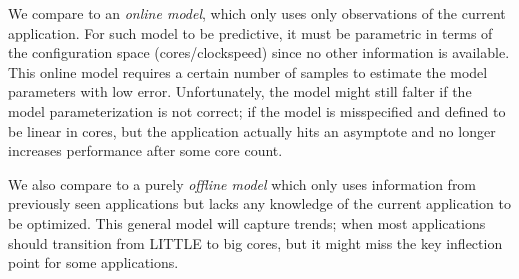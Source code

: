 


We compare \SYSTEM{} to an \emph{online model}, which only uses only
observations of the current application.  For such model to be
predictive, it must be parametric in terms of the configuration space
(cores/clockspeed) since no other information is available. This
online model requires a certain number of samples to estimate the
model parameters with low error.  Unfortunately, the model might still
falter if the model parameterization is not correct; \eg{} if the model
is misspecified and defined to be linear in cores, but the application
actually hits an asymptote and no longer increases performance after
some core count.

We also compare \SYSTEM{} to a purely \emph{offline model} which only
uses information from previously seen applications but lacks any
knowledge of the current application to be optimized. This general
model will capture trends; \eg{} when most applications should
transition from LITTLE to big cores, but it might miss the key
inflection point for some applications.

